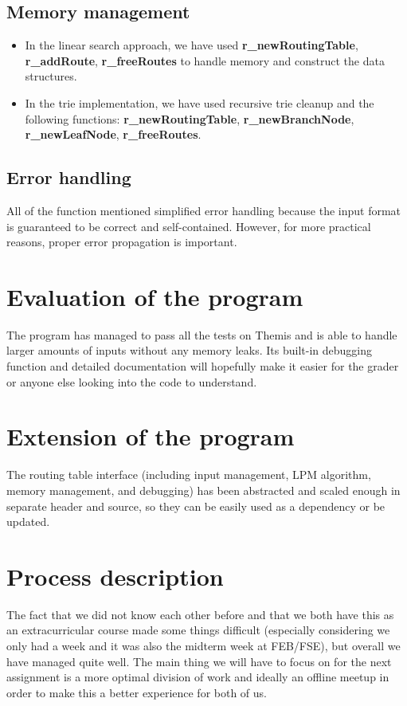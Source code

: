 \documentclass{lpm/adsrprt}
\begin{document}
\subsection{Memory management}
\begin{itemize}
    \item \> In the linear search approach, we have used \textbf{r\_newRoutingTable}, \textbf{r\_addRoute}, \textbf{r\_freeRoutes} to handle memory and construct the data structures.
    \item \> In the trie implementation, we have used recursive trie cleanup and the following functions: \textbf{r\_newRoutingTable}, \textbf{r\_newBranchNode}, \textbf{r\_newLeafNode}, \textbf{r\_freeRoutes}.
\end{itemize} 

\subsection{Error handling}
All of the function mentioned simplified error handling because the input format is guaranteed to be correct and self-contained. However, for more practical reasons, proper error propagation is important.

\section{Evaluation of the program}

The program has managed to pass all the tests on Themis and is able to handle larger amounts of inputs without any memory leaks. Its built-in debugging function and detailed documentation will hopefully make it easier for the grader or anyone else looking into the code to understand.

\section{Extension of the program}

The routing table interface (including input management, LPM algorithm, memory management, and debugging) has been abstracted and scaled enough in separate header and source, so they can be easily used as a dependency or be updated.

\section{Process description}

The fact that we did not know each other before and that we both have this as an extracurricular course made some things difficult (especially considering we only had a week and it was also the midterm week at FEB/FSE), but overall we have managed quite well. The main thing we will have to focus on for the next assignment is a more optimal division of work and ideally an offline meetup in order to make this a better experience for both of us.
\end{document}
